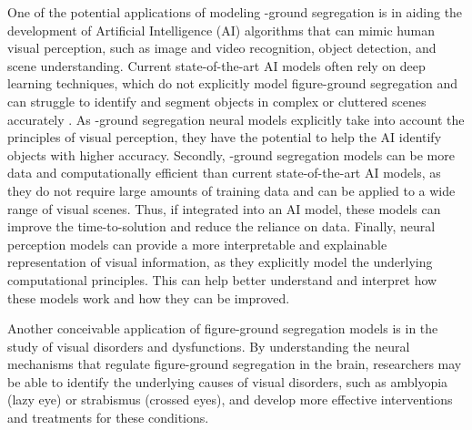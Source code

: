 One of the potential applications of modeling \stimfig-ground segregation is in aiding the development of Artificial Intelligence (AI) algorithms that can mimic human visual perception, such as image and video recognition, object detection, and scene understanding. Current state-of-the-art AI models often rely on deep learning techniques, which do not explicitly model figure-ground segregation and can struggle to identify and segment objects in complex or cluttered scenes accurately \cite{Chu2020}. As \stimfig-ground segregation neural models explicitly take into account the principles of visual perception, they have the potential to help the AI identify objects with higher accuracy.
Secondly, \stimfig-ground segregation models can be more data and computationally efficient than current state-of-the-art AI models, as they do not require large amounts of training data and can be applied to a wide range of visual scenes. Thus, if integrated into an AI model, these models can improve the time-to-solution and reduce the reliance on data.
Finally, neural perception models can provide a more interpretable and explainable representation of visual information, as they explicitly model the underlying computational principles. This can help better understand and interpret how these models work and how they can be improved.

Another conceivable application of figure-ground segregation models is in the study of visual disorders and dysfunctions. By understanding the neural mechanisms that regulate figure-ground segregation in the brain, researchers may be able to identify the underlying causes of visual disorders, such as amblyopia (lazy eye) or strabismus (crossed eyes), and develop more effective interventions and treatments for these conditions.

